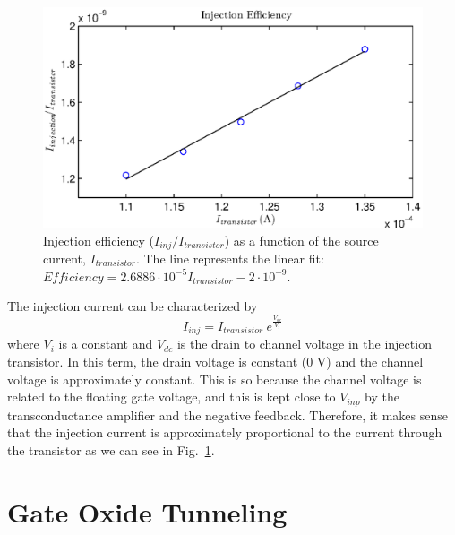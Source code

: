 \begin{figure}[!h]
	\center
	\includegraphics{exp2.eps}
	\caption{Injection efficiency ($I_{inj}/I_{transistor}$) as a function of the source current, $I_{transistor}$. The line represents the linear fit: $Efficiency = 2.6886\cdot10^{-5} I_{transistor} -2\cdot10^{-9}$.}
	\label{fig:exp2}
\end{figure}

The injection current can be characterized by 
\begin{equation*}
	I_{inj} = I_{transistor}~e^{\frac{V_{dc}}{V_{i}}}
\end{equation*}
where $V_i$ is a constant and $V_{dc}$ is the drain to channel voltage in the injection transistor. In this term, the drain voltage is constant (0 V) and the channel voltage is approximately constant. This is so because the channel voltage is related to the floating gate voltage, and this is kept close to $V_{inp}$ by the transconductance amplifier and the negative feedback. Therefore, it makes sense that the injection current is approximately proportional to the current through the transistor as we can see in Fig.~\ref{fig:exp2}.
\\
\section{Gate Oxide Tunneling}

